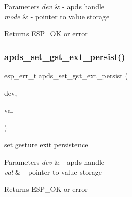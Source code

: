 \begin{DoxyParams}{Parameters}
{\em dev} & -\/ apds handle \\
\hline
{\em mode} & -\/ pointer to value storage \\
\hline
\end{DoxyParams}
\begin{DoxyReturn}{Returns}
E\+S\+P\+\_\+\+OK or error 
\end{DoxyReturn}
\mbox{\label{group__APDS9960__GestureFunctions_ga1e2b489514bf8ac82fcf1e9d44d68396}} 
\subsubsection{\texorpdfstring{apds\+\_\+set\+\_\+gst\+\_\+ext\+\_\+persist()}{apds\_set\_gst\_ext\_persist()}}
{\footnotesize\ttfamily esp\+\_\+err\+\_\+t apds\+\_\+set\+\_\+gst\+\_\+ext\+\_\+persist (\begin{DoxyParamCaption}\item[{\hyperlink{structAPDS9960__Driver}{A\+P\+D\+S\+\_\+\+D\+EV}}]{dev,  }\item[{\hyperlink{vl53l0x__types_8h_aba7bc1797add20fe3efdf37ced1182c5}{uint8\+\_\+t} $\ast$}]{val }\end{DoxyParamCaption})}




\begin{DoxyItemize}
\item set gesture exit persistence 
\end{DoxyItemize}


\begin{DoxyParams}{Parameters}
{\em dev} & -\/ apds handle \\
\hline
{\em val} & -\/ pointer to value storage \\
\hline
\end{DoxyParams}
\begin{DoxyReturn}{Returns}
E\+S\+P\+\_\+\+OK or error 
\end{DoxyReturn}
\mbox{\label{group__APDS9960__GestureFunctions_gac1a57bc5aafbf162eecc2cd0939407a5}} 
